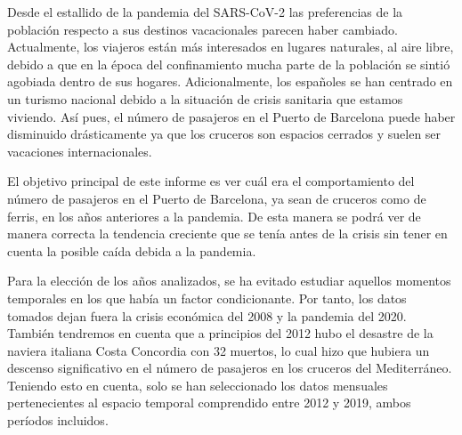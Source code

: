 \documentclass[
]{article}
\begin{document}
Desde el estallido de la pandemia del SARS-CoV-2 las preferencias de la
población respecto a sus destinos vacacionales parecen haber cambiado.
Actualmente, los viajeros están más interesados en lugares naturales, al
aire libre, debido a que en la época del confinamiento mucha parte de la
población se sintió agobiada dentro de sus hogares. Adicionalmente, los
españoles se han centrado en un turismo nacional debido a la situación
de crisis sanitaria que estamos viviendo. Así pues, el número de
pasajeros en el Puerto de Barcelona puede haber disminuido drásticamente
ya que los cruceros son espacios cerrados y suelen ser vacaciones
internacionales.

El objetivo principal de este informe es ver cuál era el comportamiento
del número de pasajeros en el Puerto de Barcelona, ya sean de cruceros
como de ferris, en los años anteriores a la pandemia. De esta manera se
podrá ver de manera correcta la tendencia creciente que se tenía antes
de la crisis sin tener en cuenta la posible caída debida a la pandemia.

Para la elección de los años analizados, se ha evitado estudiar aquellos
momentos temporales en los que había un factor condicionante. Por tanto,
los datos tomados dejan fuera la crisis económica del 2008 y la pandemia
del 2020. También tendremos en cuenta que a principios del 2012 hubo el
desastre de la naviera italiana Costa Concordia con 32 muertos, lo cual
hizo que hubiera un descenso significativo en el número de pasajeros en
los cruceros del Mediterráneo. Teniendo esto en cuenta, solo se han
seleccionado los datos mensuales pertenecientes al espacio temporal
comprendido entre 2012 y 2019, ambos períodos incluidos.

\medskip
\end{document}
